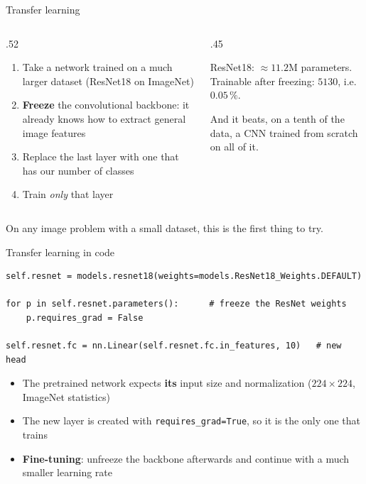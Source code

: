 \documentclass[aspectratio=169,10pt]{beamer}
\begin{document}
\begin{frame}{Transfer learning}
\begin{columns}[T]
\begin{column}{.52\textwidth}
\begin{enumerate}\small
  \item Take a network trained on a much larger dataset (ResNet18 on ImageNet)
  \item \textbf{Freeze} the convolutional backbone: it already knows how to extract
        general image features
  \item Replace the last layer with one that has our number of classes
  \item Train \emph{only} that layer
\end{enumerate}
\end{column}
\begin{column}{.45\textwidth}
\begin{keybox}
\small
ResNet18: $\approx 11.2$M parameters.\\
Trainable after freezing: $5130$, i.e. $0.05\,\%$.

\medskip
And it beats, on a tenth of the data, a CNN trained from scratch on all of it.
\end{keybox}
\end{column}
\end{columns}
\vspace{.5em}
\begin{center}\small
On any image problem with a small dataset, this is the first thing to try.
\end{center}
\end{frame}

\begin{frame}[fragile]{Transfer learning in code}
\begin{lstlisting}
self.resnet = models.resnet18(weights=models.ResNet18_Weights.DEFAULT)

for p in self.resnet.parameters():      # freeze the ResNet weights
    p.requires_grad = False

self.resnet.fc = nn.Linear(self.resnet.fc.in_features, 10)   # new head
\end{lstlisting}
\begin{itemize}\small
  \item The pretrained network expects \textbf{its} input size and normalization
        ($224\times224$, ImageNet statistics)
  \item The new layer is created with \texttt{requires\_grad=True}, so it is the only one
        that trains
  \item \textbf{Fine-tuning}: unfreeze the backbone afterwards and continue with a much
        smaller learning rate
\end{itemize}
\end{frame}
\end{document}
